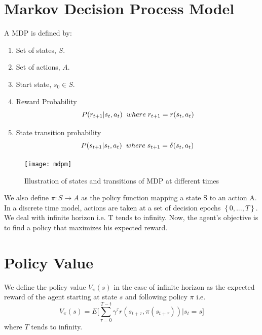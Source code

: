 \section{Markov Decision Process Model}
A MDP is defined by:
\begin{enumerate}
    \item Set of states, $S$.
    \item Set of actions, $A$.
    \item Start state, $s_{0} \in S$.
    \item Reward Probability  
    \begin{equation} \label{eq:rew_prob}
    P(r_{t+1} | s_{t}, a_{t}) \hspace{0.2cm} where \hspace{0.1cm} r_{t+1} = r(s_{t}, a_{t})
    \end{equation}
    \item State transition probability
    \begin{equation} \label{eq:state_trans_prob}
    P(s_{t+1} | s_{t}, a_{t}) \hspace{0.2cm} where \hspace{0.1cm} s_{t+1} = \delta(s_{t}, a_{t})
    \end{equation}
\end{enumerate}

\begin{figure}[h]
\centering
\texttt{[image: mdpm]}
\caption[width=\textwidth]{Illustration of states and transitions of MDP at different times}
\label{fig:mdpm}
\end{figure}

We also define $\pi:S \rightarrow A$ as the policy function mapping a state S to an action A. In a discrete time model, actions are taken at a set of decision epochs $\left \{ 0, ..., T \right \}$. We deal with infinite horizon i.e. T tends to infinity. Now, the agent's objective is to find a policy that maximizes his expected reward.


\section{Policy Value}
We define the policy value  $V_{\pi}(s)$ in the case of infinite horizon as the expected reward of the agent starting at state $s$ and following policy $\pi$ i.e.
\begin{equation} \label{eq:polVal}
V_{\pi}(s) = E\bigg[ \sum_{\tau=0}^{T-t} \gamma^\tau r(s_{t+\tau}, \pi(s_{t+\tau})) | s_{t} = s \bigg]
\end{equation}
where $T$ tends to infinity.

